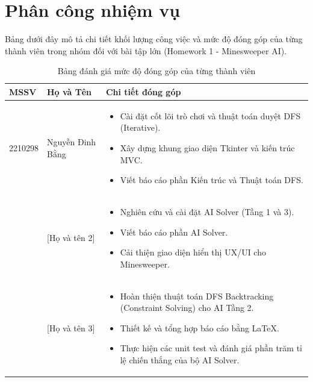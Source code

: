 \section{Phân công nhiệm vụ}

Bảng dưới đây mô tả chi tiết khối lượng công việc và mức độ đóng góp của từng thành viên trong nhóm đối với bài tập lớn (Homework 1 - Minesweeper AI).

\begin{table}[H]
    \centering
    \begin{tabularx}{\textwidth}{|l|l|X|}
    \hline
    \textbf{MSSV} & \textbf{Họ và Tên} & \textbf{Chi tiết đóng góp} \\ \hline
    2210298 & Nguyễn Đinh Bằng & 
    \begin{itemize}
        \vspace{-0.2cm}
        \item Cài đặt cốt lõi trò chơi và thuật toán duyệt DFS (Iterative).
        \item Xây dựng khung giao diện Tkinter và kiến trúc MVC.
        \item Viết báo cáo phần Kiến trúc và Thuật toán DFS.
        \vspace{-0.2cm}
    \end{itemize} \\ \hline
    [MSSV 2] & [Họ và tên 2] & 
    \begin{itemize}
        \vspace{-0.2cm}
        \item Nghiên cứu và cài đặt AI Solver (Tầng 1 và 3).
        \item Viết báo cáo phần AI Solver.
        \item Cải thiện giao diện hiển thị UX/UI cho Minesweeper.
        \vspace{-0.2cm}
    \end{itemize} \\ \hline
    [MSSV 3] & [Họ và tên 3] & 
    \begin{itemize}
        \vspace{-0.2cm}
        \item Hoàn thiện thuật toán DFS Backtracking (Constraint Solving) cho AI Tầng 2.
        \item Thiết kế và tổng hợp báo cáo bằng \LaTeX{}.
        \item Thực hiện các unit test và đánh giá phần trăm tỉ lệ chiến thắng của bộ AI Solver.
        \vspace{-0.2cm}
    \end{itemize} \\ \hline
    \end{tabularx}
    \caption{Bảng đánh giá mức độ đóng góp của từng thành viên}
\end{table}
